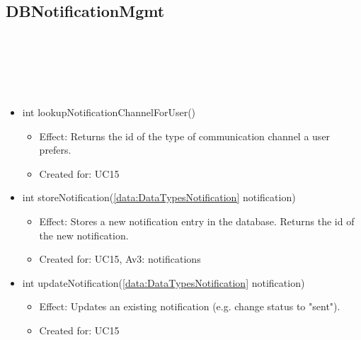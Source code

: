   \subsection{DBNotificationMgmt}\label{int:OtherDataDatabaseOtherDataDBDBNotificationMgmt}
    \begin{description}
      \item[Provided by:] \iconcomponent{}~
      \item[Required by:] \iconcomponent{}~
      \item[Operations:] ~
    \begin{itemize}[noitemsep,nolistsep,leftmargin=-.25cm]
      \item \textsf{int lookupNotificationChannelForUser()}
        \begin{itemize}[noitemsep,nolistsep]
           \item Effect: Returns the id of the type of communication channel a user prefers.
\item Created for: UC15
        \end{itemize}
      \item \textsf{int storeNotification(\ref{data:DataTypesNotification} notification)}
        \begin{itemize}[noitemsep,nolistsep]
           \item Effect: Stores a new notification entry in the database. Returns the id of the new notification. \\
\item Created for: UC15, Av3: notifications
        \end{itemize}
      \item \textsf{int updateNotification(\ref{data:DataTypesNotification} notification)}
        \begin{itemize}[noitemsep,nolistsep]
           \item Effect: Updates an existing notification (e.g. change status to "sent").
\item Created for: UC15
        \end{itemize}
    \end{itemize}
    \end{description}

